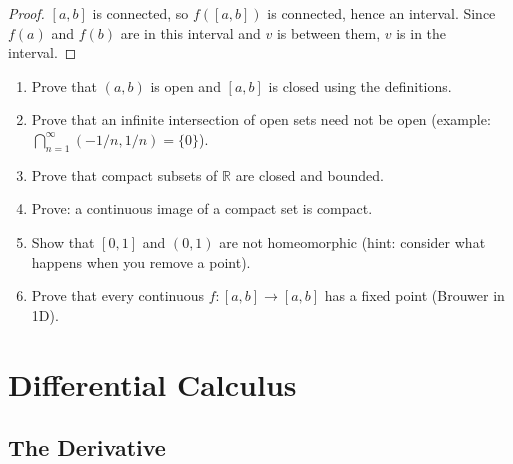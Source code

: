 \documentclass[12pt, openany]{book}
\theoremstyle{plain}
\theoremstyle{definition}
\theoremstyle{remark}
\newcommand{\R}{\mathbb{R}}
\begin{document}
\begin{proof}
$[a,b]$ is connected, so $f([a,b])$ is connected, hence an interval. Since $f(a)$ and $f(b)$ are in this interval and $v$ is between them, $v$ is in the interval.
\end{proof}

\begin{exbox}
\begin{enumerate}
  \item Prove that $(a,b)$ is open and $[a,b]$ is closed using the definitions.
  \item Prove that an infinite intersection of open sets need not be open (example: $\bigcap_{n=1}^\infty (-1/n, 1/n) = \{0\}$).
  \item Prove that compact subsets of $\R$ are closed and bounded.
  \item Prove: a continuous image of a compact set is compact.
  \item Show that $[0,1]$ and $(0,1)$ are not homeomorphic (hint: consider what happens when you remove a point).
  \item Prove that every continuous $f : [a,b] \to [a,b]$ has a fixed point (Brouwer in 1D).
\end{enumerate}
\end{exbox}
\color{black}

\part{Differential Calculus}
\color{black}

\chapter{The Derivative}
\color{black}
\end{document}
